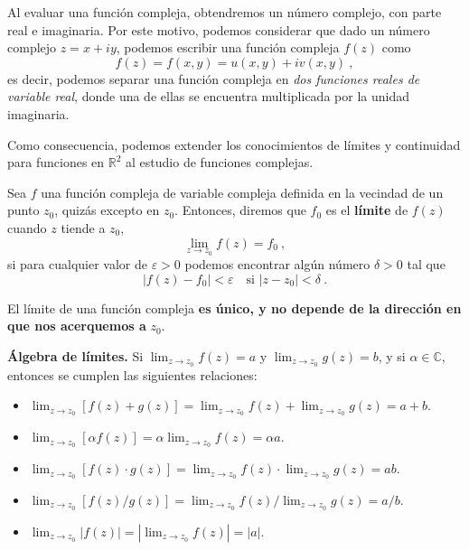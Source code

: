 Al evaluar una función compleja, obtendremos un número complejo, con parte real e imaginaria. Por este motivo, podemos considerar que dado un número complejo $z = x+iy$, podemos escribir una función compleja $f(z)$ como
\begin{equation*}
    f(z) = f(x,y) = u(x,y) + i v(x,y) \ ,
\end{equation*}
es decir, podemos separar una función compleja en \emph{dos funciones reales de variable real}, donde una de ellas se encuentra multiplicada por la unidad imaginaria.

Como consecuencia, podemos extender los conocimientos de límites y continuidad para funciones en $\mathbb{R}^2$ al estudio de funciones complejas.

\begin{defi} 
    Sea $f$ una función compleja de variable compleja definida en la vecindad de un punto $z_0$, quizás excepto en $z_0$. Entonces, diremos que $f_0$ es el \textbf{límite} de $f(z)$ cuando $z$ tiende a $z_0$,
    \begin{equation*}
        \lim_{z \to z_0} f(z) = f_0 \ ,
    \end{equation*}
    si para cualquier valor de $\varepsilon > 0$ podemos encontrar algún número $\delta > 0$ tal que 
    \begin{equation*}
        |f(z) - f_0| < \varepsilon \quad \text{si } |z - z_0| < \delta \ . 
    \end{equation*}

    El límite de una función compleja \textbf{es único, y no depende de la dirección en que nos acerquemos a } $z_0$.
\end{defi}

\begin{teorema}{\textbf{Álgebra de límites.}}
    Si $\lim_{z \to z_0} f(z) = a$ y $\lim_{z \to z_0} g(z) = b$, y si $\alpha \in \mathbb{C}$, entonces se cumplen las siguientes relaciones:
    \begin{itemize}
        \item $\lim_{z \to z_0} [f(z) + g(z)] = \lim_{z \to z_0} f(z) + \lim_{z \to z_0} g(z) = a + b$.
        \item $\lim_{z \to z_0} [\alpha f(z)] = \alpha \lim_{z \to z_0} f(z) = \alpha a$.
        \item $\lim_{z \to z_0} [f(z) \cdot g(z)] = \lim_{z \to z_0} f(z) \cdot \lim_{z \to z_0} g(z) = ab$.
        \item $\lim_{z \to z_0} [f(z) / g(z)] = \lim_{z \to z_0} f(z) / \lim_{z \to z_0} g(z) = a / b$.
        \item $\lim_{z \to z_0} |f(z)| = \left| \lim_{z \to z_0} f(z) \right| = |a|$.
    \end{itemize}
\end{teorema}

